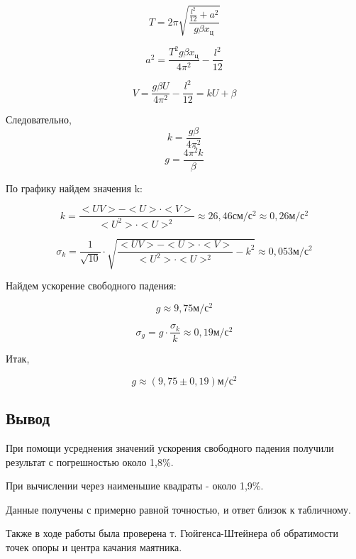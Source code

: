 \documentclass[a4paper,12pt]{article} %
\begin{document}
\begin{enumerate}
\[T = 2 \pi \sqrt{\frac{\frac{l^2}{12}+a^2}{g\beta x_{ц}}}\]

\[a^2 = \frac{T^2g\beta x_{ц}}{4\pi^2}-\frac{l^2}{12}\]

\[V = \frac{g\beta U}{4\pi^2}-\frac{l^2}{12}=kU+\beta\]

Следовательно, 
\[k=\frac{g\beta}{4\pi^2}\]
\[g=\frac{4\pi^2k}{\beta}\]

По графику найдем значения k:

\[k=\frac{<UV>-<U>\cdot<V>}{<U^2>\cdot<U>^2}\approx 26,46 см/с^2 \approx 0,26 м/с^2\]

\[\sigma_k=\frac{1}{\sqrt{10}}\cdot \sqrt{\frac{<UV>-<U>\cdot<V>}{<U^2>\cdot<U>^2}-k^2}\approx 0,053м/с^2\]

Найдем ускорение свободного падения: 

\[ g \approx 9,75 м/с^2\]

\[\sigma_g = g\cdot \frac{\sigma_k}{k}\approx 0,19 м/с^2\]

Итак, 

\[g\approx (9,75\pm0,19)м/с^2\]


\end{enumerate}



\subsection*{Вывод}

При помощи усреднения значений ускорения свободного
 падения получили результат с погрешностью около 1,8\%.

 При вычислении через наименьшие квадраты - около 1,9\%.

 Данные получены с примерно равной точностью, и ответ близок к табличному.

 Также в ходе работы была проверена т. Гюйгенса-Штейнера об обратимости точек опоры и центра качания маятника.
\end{document}
